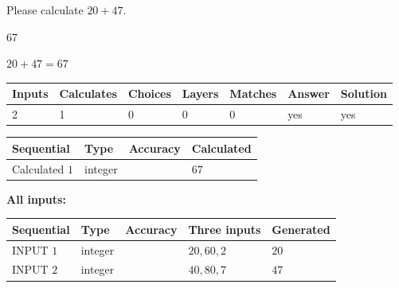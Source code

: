 \documentclass[12pt]{article}
\begin{document}
  
 
Please calculate $ %
20 +  %
47 $.
 
 
 
\noindent{}
 
 

67
 
 
\noindent{}
 
 

 
 
 
\noindent{}
 
 

$ %
20 +  %
47=   %
67$
 
 
\noindent{}
 
 

 
   
   
   
   
\noindent\begin{tabular}{|l|l|l|l|l|l|l|}
 \hline
Inputs & Calculates & Choices & Layers & Matches & Answer & Solution \\ \hline
 2  & 
 1  & 
 0
  & 
 0  & 
 0  & 
  yes & 
  yes 
  \\ \hline
 \end{tabular}
   
   
   
   
\noindent{}
   
   
  
  
\noindent\begin{tabular}{|l|l|l|l|}
\hline
 Sequential & Type & Accuracy & Calculated \\ 
\hline
 
 
  Calculated $  1 $ & integer &  & 
  $ 67 $ 
 \\  \hline  
 \end{tabular}
   
   
   
   
\noindent\vspace{0.1in}\hspace{-0.08in} {\textbf{\Large{All inputs: }}}
   
   
  
  
\noindent\begin{tabular}{|l|l|l|l|l|}
\hline
 Sequential & Type & Accuracy & Three inputs & Generated \\ 
\hline
 
 
  INPUT $  1 $ & integer &  & $
 20
 , 
 60
 , 
 2
 $ & $ 20 $ 
 \\  \hline  
 
 
  INPUT $  2 $ & integer &  & $
 40
 , 
 80
 , 
 7
 $ & $ 47 $ 
 \\  \hline  
 \end{tabular}
   
\end{document}
